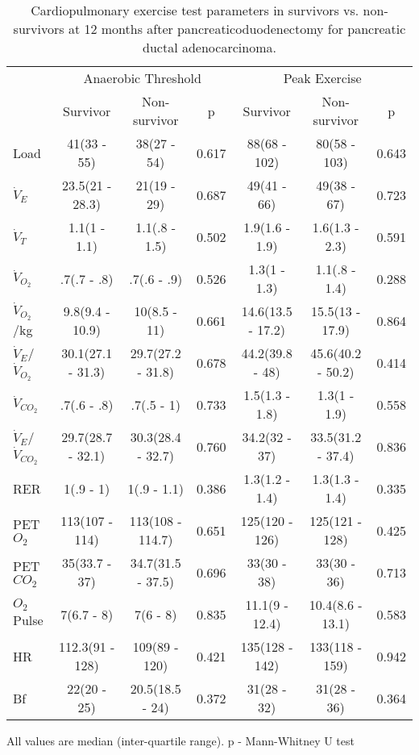 \begin{sidewaystable}[p]
	\centering
	\caption{Cardiopulmonary exercise test parameters in survivors vs. non-survivors at 12 months after pancreaticoduodenectomy for pancreatic ductal adenocarcinoma. }
	\label{table:cpet_survival_12months}
	\renewcommand{\arraystretch}{1.2} %
	\begin{tabular}{l | c c c | c c c}
		                             &    \multicolumn{3}{c}{Anaerobic Threshold}    &       \multicolumn{3}{c}{Peak Exercise}       \\
		                             & Survivor          & Non-survivor      & p     & Survivor          & Non-survivor      & p     \\ \hline
		Load                         & 41(33 - 55)       & 38(27 - 54)       & 0.617 & 88(68 - 102)      & 80(58 - 103)      & 0.643 \\
		$\dot{V}_E$                  & 23.5(21 - 28.3)   & 21(19 - 29)       & 0.687 & 49(41 - 66)       & 49(38 - 67)       & 0.723 \\
		$\dot{V}_T$                  & 1.1(1 - 1.1)      & 1.1(.8 - 1.5)     & 0.502 & 1.9(1.6 - 1.9)    & 1.6(1.3 - 2.3)    & 0.591 \\
		$\dot{V}_{O_2}$              & .7(.7 - .8)       & .7(.6 - .9)       & 0.526 & 1.3(1 - 1.3)      & 1.1(.8 - 1.4)     & 0.288 \\
		$\dot{V}_{O_2}$/kg           & 9.8(9.4 - 10.9)   & 10(8.5 - 11)      & 0.661 & 14.6(13.5 - 17.2) & 15.5(13 - 17.9)   & 0.864 \\
		$\dot{V}_E$/$\dot{V}_{O_2}$  & 30.1(27.1 - 31.3) & 29.7(27.2 - 31.8) & 0.678 & 44.2(39.8 - 48)   & 45.6(40.2 - 50.2) & 0.414 \\
		$\dot{V}_{CO_2}$             & .7(.6 - .8)       & .7(.5 - 1)        & 0.733 & 1.5(1.3 - 1.8)    & 1.3(1 - 1.9)      & 0.558 \\
		$\dot{V}_E$/$\dot{V}_{CO_2}$ & 29.7(28.7 - 32.1) & 30.3(28.4 - 32.7) & 0.760 & 34.2(32 - 37)     & 33.5(31.2 - 37.4) & 0.836 \\
		RER                          & 1(.9 - 1)         & 1(.9 - 1.1)       & 0.386 & 1.3(1.2 - 1.4)    & 1.3(1.3 - 1.4)    & 0.335 \\
		PET$O_2$                     & 113(107 - 114)    & 113(108 - 114.7)  & 0.651 & 125(120 - 126)    & 125(121 - 128)    & 0.425 \\
		PET$CO_2$                    & 35(33.7 - 37)     & 34.7(31.5 - 37.5) & 0.696 & 33(30 - 38)       & 33(30 - 36)       & 0.713 \\
		$O_2$Pulse                   & 7(6.7 - 8)        & 7(6 - 8)          & 0.835 & 11.1(9 - 12.4)    & 10.4(8.6 - 13.1)  & 0.583 \\
		HR                   & 112.3(91 - 128)   & 109(89 - 120)     & 0.421 & 135(128 - 142)    & 133(118 - 159)    & 0.942 \\
		Bf            & 22(20 - 25)       & 20.5(18.5 - 24)   & 0.372 & 31(28 - 32)       & 31(28 - 36)       & 0.364\\ \hline
	\end{tabular}
	
	
	All values are median (inter-quartile range). p - Mann-Whitney U test
\end{sidewaystable}
